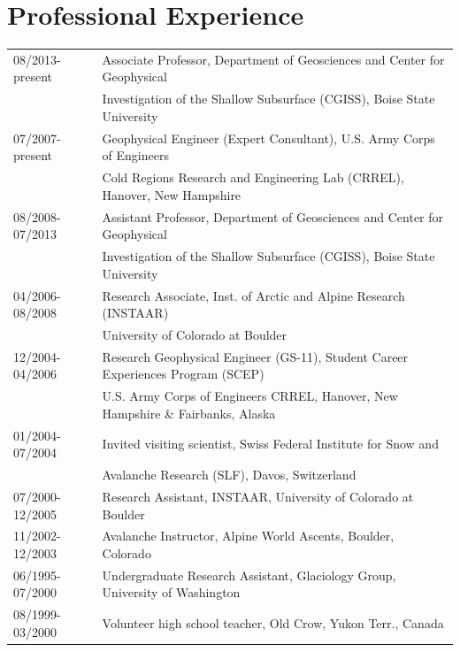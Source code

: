 \documentclass[11pt]{article}
\begin{document}
\section*{Professional Experience}
\begin{tabular}{ll}
08/2013-present & Associate Professor, Department of Geosciences and Center for Geophysical \\
&   Investigation of the Shallow Subsurface (CGISS), Boise State University \\
07/2007-present & Geophysical Engineer (Expert Consultant), U.S. Army Corps of Engineers \\
& Cold Regions Research and Engineering Lab (CRREL), Hanover, New Hampshire \\
08/2008-07/2013 & Assistant Professor, Department of Geosciences and Center for Geophysical \\
&   Investigation of the Shallow Subsurface (CGISS), Boise State University \\
04/2006-08/2008 & Research Associate, Inst. of Arctic and Alpine Research (INSTAAR) \\
& University of Colorado at Boulder \\ 
12/2004-04/2006 & Research Geophysical Engineer (GS-11), Student Career Experiences Program (SCEP) \\
& U.S. Army Corps of Engineers CRREL, Hanover, New Hampshire \& Fairbanks, Alaska \\
01/2004-07/2004 & Invited visiting scientist, Swiss Federal Institute for Snow and \\ 
& Avalanche Research (SLF), Davos, Switzerland \\ 
07/2000-12/2005 & Research Assistant, INSTAAR, University of Colorado at Boulder \\
11/2002-12/2003 & Avalanche Instructor, Alpine World Ascents, Boulder, Colorado \\
06/1995-07/2000 & Undergraduate Research Assistant, Glaciology Group, University of Washington \\
08/1999-03/2000 & Volunteer high school teacher, Old Crow, Yukon Terr., Canada \\
\end{tabular}
\end{document}
